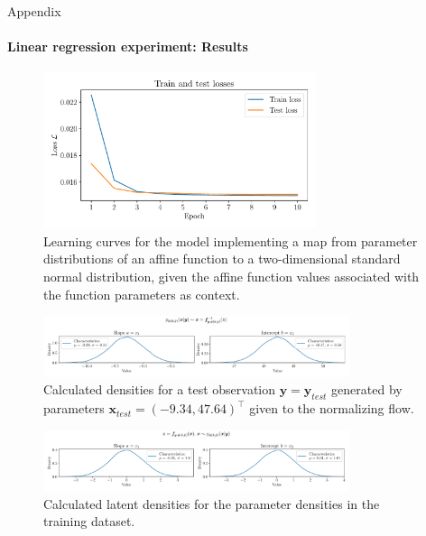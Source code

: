 \documentclass{beamer}
\newcommand\vect[1]{\ensuremath{\bm{#1}}}
\begin{document}
\begin{frame}[allowframebreaks]{Appendix}
	\framesubtitle{Linear regression experiment: Results}
	\begin{figure}[h!]
		\centering
		\includegraphics[width=8cm]{figures/thesis/nf-linear-regression-example-loss.pdf}
		\caption{Learning curves for the model implementing a map from parameter distributions of an affine function to a two-dimensional standard normal distribution, given the affine function values associated with the function parameters as context.}
		\label{fig:nf-linear-regression-example-loss}
	\end{figure}
	
	\begin{figure}[h!]
		\centering
		\includegraphics[width=0.8\textwidth]{figures/thesis/nf-linear-regression-example-calctargetdensities.pdf}
		\caption{Calculated densities for a test observation $\vect{y} = \vect{y}_{test}$ generated by parameters $\vect{x}_{test} = (-9.34, 47.64)^\top$ given to the normalizing flow.}
		\label{fig:nf-linear-regression-example-calctargetdensities}
	\end{figure}
	
	\begin{figure}[h!]
		\centering
		\includegraphics[width=0.8\textwidth]{figures/thesis/nf-linear-regression-example-calcbasedensities.pdf}
		\caption{Calculated latent densities for the parameter densities in the training dataset.}
		\label{fig:nf-linear-regression-example-calcbasedensities}
	\end{figure}
	

\end{frame}
\end{document}
